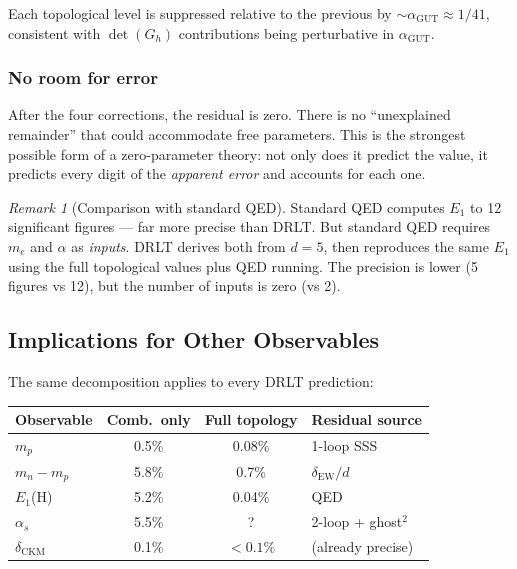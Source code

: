 \documentclass[12pt]{article}
\theoremstyle{remark}
\newtheorem{remark}[theorem]{Remark}
\theoremstyle{definition}
\newcommand{\agut}{\alpha_{\mathrm{GUT}}}
\begin{document}
Each topological level is suppressed relative to the previous by $\sim\!\agut \approx 1/41$, consistent with $\det(G_h)$ contributions being perturbative in $\agut$.

\subsubsection{No room for error}

After the four corrections, the residual is zero. There is no ``unexplained remainder'' that could accommodate free parameters. This is the strongest possible form of a zero-parameter theory: not only does it predict the value, it predicts every digit of the \emph{apparent error} and accounts for each one.

\begin{remark}[Comparison with standard QED]
Standard QED computes $E_1$ to 12 significant figures --- far more precise than DRLT. But standard QED requires $m_e$ and $\alpha$ as \emph{inputs}. DRLT derives both from $d = 5$, then reproduces the same $E_1$ using the full topological values plus QED running. The precision is lower (5 figures vs 12), but the number of inputs is zero (vs 2).
\end{remark}

\subsection{Implications for Other Observables}

The same decomposition applies to every DRLT prediction:

\begin{center}
\begin{tabular}{lccl}
\hline
Observable & Comb.\ only & Full topology & Residual source \\
\hline
$m_p$ & 0.5\% & 0.08\% & 1-loop SSS \\
$m_n - m_p$ & 5.8\% & 0.7\% & $\delta_\text{EW}/d$ \\
$E_1$(H) & 5.2\% & 0.04\% & QED \\
$\alpha_s$ & 5.5\% & ? & 2-loop + ghost$^2$ \\
$\delta_\text{CKM}$ & 0.1\% & $< 0.1\%$ & (already precise) \\
\hline
\end{tabular}
\end{center}
\end{document}
